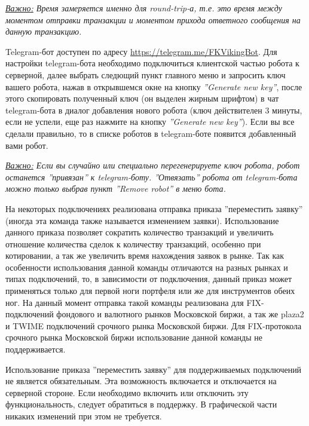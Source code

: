 \noindent\textit{\underline{Важно:} Время замеряется именно для round-trip-а, т.е. это время между моментом отправки транзакции и моментом прихода ответного
сообщения на данную транзакцию.}


Telegram-бот доступен по адресу \href{https://telegram.me/FKVikingBot}{https://telegram.me/FKVikingBot}.
Для настройки telegram-бота необходимо подключиться клиентской частью робота к серверной, далее выбрать следющий 
пункт главного меню 
и запросить ключ вашего робота, нажав в открывшемся окне на кнопку \textit{''Generate new key''}, после этого скопировать полученный ключ (он выделен жирным шрифтом) в чат
telegram-бота в диалог добавления нового робота (ключ действителен $3$ минуты, если не успели, еще раз нажмите на кнопку \textit{''Generate new key''}). Если вы все сделали
правильно, то в списке роботов в telegram-боте появится добавленный вами робот.\newline

\noindent\textit{\underline{Важно:} Если вы случайно или специально перегенерируете ключ робота, робот останется ''привязан'' к telegram-боту. ''Отвязать''
робота от telegram-бота можно только выбрав пункт ''Remove robot'' в меню бота.}

\label{move}

На некоторых подключениях реализована отправка приказа ''переместить заявку'' (иногда эта команда также называется изменением заявки). Использование
данного приказа позволяет сократить количество транзакций и увеличить отношение количества сделок к количеству транзакций, особенно при котировании,
а так же увеличить время нахождения заявок в рынке. Так как особенности использования данной команды отличаются на разных рынках и типах подключений,
то, в зависимости от подключения, данный приказ может применяться только для первой ноги портфеля или же для инструментов обеих ног. На данный момент
отправка такой команды реализована для FIX-подключений фондового и валютного рынков Московской биржи, а так же plaza2 и TWIME подключений срочного
рынка Московской биржи. Для FIX-протокола срочного рынка Московской биржи использование данной команды не поддерживается.

Использование приказа ''переместить заявку'' для поддерживаемых подключений не является обязательным. Эта возможность включается и отключается на
серверной стороне. Если необходимо включить или отключить эту функциональность, следует обратиться в поддержку. В графической части никаких изменений
при этом не требуется.

